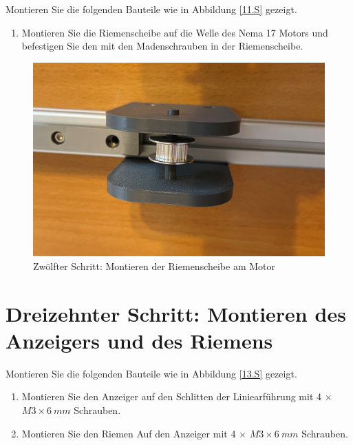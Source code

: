 Montieren Sie die folgenden Bauteile wie in Abbildung \ref{11.S} gezeigt.

\begin{enumerate}
	\item Montieren Sie die Riemenscheibe auf die Welle des Nema 17 Motors und befestigen Sie den mit den Madenschrauben in der Riemenscheibe. 
\end{enumerate}

\begin{figure}[H]
	\begin{center}
		\includegraphics[width=\textwidth]{Images/11Schr.jpg}
		\caption{Zwölfter Schritt: Montieren der Riemenscheibe am Motor} \label{12.S}
	\end{center}
\end{figure}


\section{Dreizehnter Schritt: Montieren des Anzeigers und des Riemens}

Montieren Sie die folgenden Bauteile wie in Abbildung \ref{13.S} gezeigt.

\begin{enumerate}
	\item Montieren Sie den Anzeiger auf den Schlitten der Liniearführung mit 4 $\times$ $ M3 \times 6 \ mm $ Schrauben.
	\item Montieren Sie den Riemen Auf den Anzeiger mit 4 $\times$ $ M3 \times 6 \ mm $ Schrauben.
\end{enumerate}

